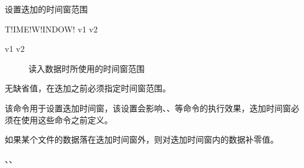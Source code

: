\label{sss:timewindow}

设置迭加的时间窗范围

\begin{SACSTX}
    T!IME!W!INDOW! v1 v2
\end{SACSTX}

\begin{description}
\item [v1 v2] 读入数据时所使用的时间窗范围
\end{description}

无缺省值，在迭加之前必须指定时间窗范围。

该命令用于设置迭加时间窗，该设置会影响、、等命令的执行效果，迭加时间窗必须在使用这些命令之前定义。

如果某个文件的数据落在迭加时间窗外，则对迭加时间窗内的数据补零值。

、、
